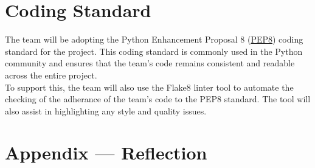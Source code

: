 \documentclass{article}
\begin{document}
\FloatBarrier 

\section{Coding Standard}
The team will be adopting the Python Enhancement Proposal 8 (\href{https://peps.python.org/pep-0008/}{PEP8}) 
coding standard for the project. This coding standard is commonly used in the 
Python community and ensures that the team's code remains 
consistent and readable across the entire project.\\
To support this, the team will also use the Flake8 linter tool to automate the 
checking of the adherance of the team's code to the PEP8 standard. The tool will
also assist in highlighting any style and quality issues.

\newpage{}

\section*{Appendix --- Reflection}
\end{document}
